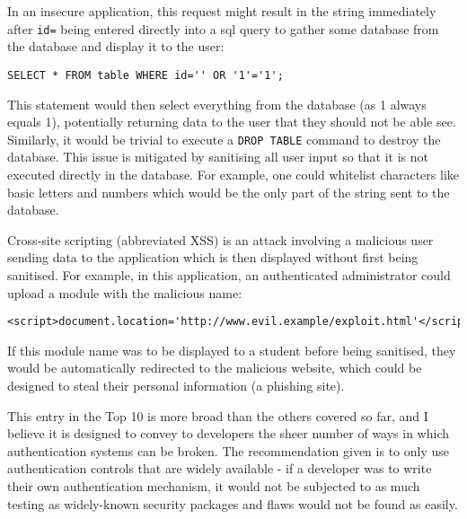 In an insecure application, this request might result in the string
immediately after \texttt{id=} being entered directly into a \gls{sql} query
to gather some database from the database and display it to the user:

\begin{lstlisting}
SELECT * FROM table WHERE id='' OR '1'='1';
\end{lstlisting}

This statement would then select everything from the database (as 1 always
equals 1), potentially returning data to the user that they should not be able
see. Similarly, it would be trivial to execute a \texttt{DROP TABLE} command
to destroy the database. This issue is mitigated by sanitising all user input
so that it is not executed directly in the database. For example, one could
whitelist characters like basic letters and numbers which would be the only
part of the string sent to the database.

\mynobreakpar

Cross-site scripting (abbreviated XSS) is an attack involving a malicious user
sending data to the application which is then displayed without first being
sanitised. For example, in this application, an authenticated administrator
could upload a module with the malicious name:

\begin{lstlisting}
<script>document.location='http://www.evil.example/exploit.html'</script>
\end{lstlisting}

If this module name was to be displayed to a student before being sanitised,
they would be automatically redirected to the malicious website, which could
be designed to steal their personal information (a phishing site).

\mynobreakpar

This entry in the Top 10 is more broad than the others covered so far, and I
believe it is designed to convey to developers the sheer number of ways in
which authentication systems can be broken. The recommendation given is to
only use authentication controls that are widely available - if a developer
was to write their own authentication mechanism, it would not be subjected to
as much testing as widely-known security packages and flaws would not be found
as easily.

\mynobreakpar


